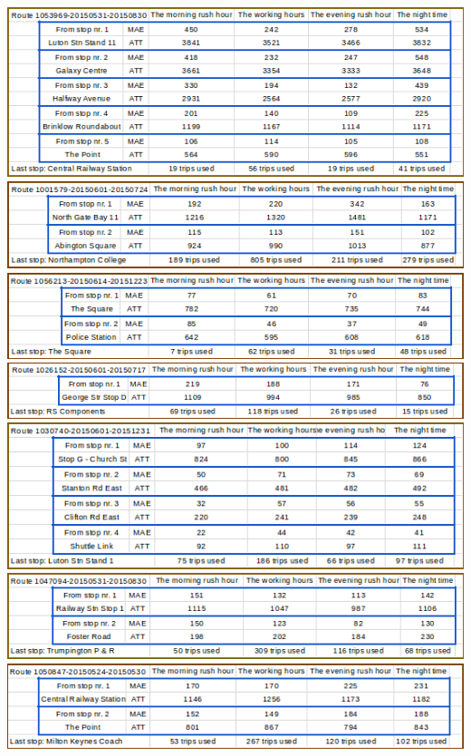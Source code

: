 \documentclass[12pt,a4paper,oneside,openright]{report}
\begin{document}
\includegraphics[width=\textwidth]{figs/table_of_1053969.png}
\includegraphics[width=\textwidth]{figs/table_of_1001579.png}
\includegraphics[width=\textwidth]{figs/table_of_1056213.png}
\includegraphics[width=\textwidth]{figs/table_of_1026152.png}
\includegraphics[width=\textwidth]{figs/table_of_1030740.png}
\includegraphics[width=\textwidth]{figs/table_of_1047094.png}
\includegraphics[width=\textwidth]{figs/table_of_1050847.png}
\end{document}
